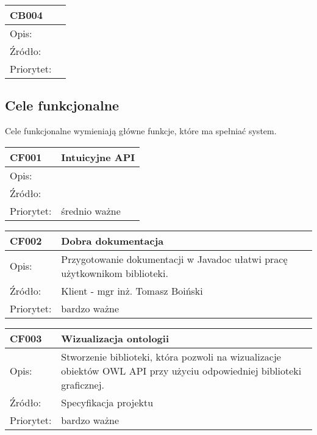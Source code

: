 \documentclass[a4paper,10pt]{article}
\begin{document}
\begin{center}
\begin{tabular}{|l|l|} \hline
CB004 &    \\ \hline
Opis: &   \\ \hline
Źródło: &  \\ \hline
Priorytet: & \\ \hline
\end{tabular}
\end{center}


\subsection{Cele funkcjonalne}

Cele funkcjonalne wymieniają główne funkcje, które ma spełniać system.

\begin{center}
\begin{tabular}{|l|l|} \hline

CF001 & Intuicyjne API \\ \hline
Opis: &  \\ \hline
Źródło: &  \\ \hline
Priorytet: & średnio ważne  \\ \hline

\end{tabular}
\end{center}

\begin{center}
\begin{tabular}{|l|l|} \hline

CF002 & Dobra dokumentacja \\ \hline
Opis: & Przygotowanie dokumentacji w Javadoc ułatwi pracę użytkownikom biblioteki. \\ \hline
Źródło: & Klient - mgr inż. Tomasz Boiński  \\ \hline
Priorytet: & bardzo ważne \\ \hline

\end{tabular}
\end{center}

\begin{center}
\begin{tabular}{|l|l|} \hline

CF003 & Wizualizacja ontologii \\ \hline
Opis: & Stworzenie biblioteki, która pozwoli na wizualizacje obiektów OWL API przy użyciu odpowiedniej biblioteki graficznej. \\ \hline
Źródło:  & Specyfikacja projektu  \\ \hline
Priorytet: & bardzo ważne \\ \hline

\end{tabular}
\end{center}
\end{document}
